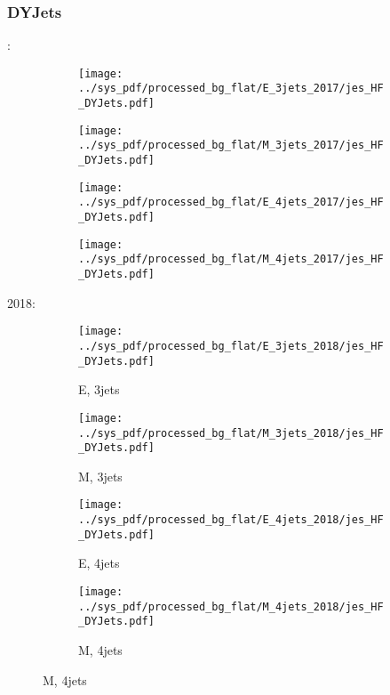 \documentclass{beamer}
\begin{document}
\begin{frame}
\frametitle{DYJets}
\fontsize{5}{1}:
\begin{figure}
\centering
\begin{subfigure}[b]{0.24\textwidth}
\texttt{[image: ../sys\_pdf/processed\_bg\_flat/E\_3jets\_2017/jes\_HF\_DYJets.pdf]}
\end{subfigure}
\begin{subfigure}[b]{0.24\textwidth}
\texttt{[image: ../sys\_pdf/processed\_bg\_flat/M\_3jets\_2017/jes\_HF\_DYJets.pdf]}
\end{subfigure}
\begin{subfigure}[b]{0.24\textwidth}
\texttt{[image: ../sys\_pdf/processed\_bg\_flat/E\_4jets\_2017/jes\_HF\_DYJets.pdf]}
\end{subfigure}
\begin{subfigure}[b]{0.24\textwidth}
\texttt{[image: ../sys\_pdf/processed\_bg\_flat/M\_4jets\_2017/jes\_HF\_DYJets.pdf]}
\end{subfigure}
\end{figure}
2018:
\begin{figure}
\centering
\begin{subfigure}[b]{0.24\textwidth}
\texttt{[image: ../sys\_pdf/processed\_bg\_flat/E\_3jets\_2018/jes\_HF\_DYJets.pdf]}
\captionsetup{font=tiny}
\caption{E, 3jets}
\end{subfigure}
\begin{subfigure}[b]{0.24\textwidth}
\texttt{[image: ../sys\_pdf/processed\_bg\_flat/M\_3jets\_2018/jes\_HF\_DYJets.pdf]}
\captionsetup{font=tiny}
\caption{M, 3jets}
\end{subfigure}
\begin{subfigure}[b]{0.24\textwidth}
\texttt{[image: ../sys\_pdf/processed\_bg\_flat/E\_4jets\_2018/jes\_HF\_DYJets.pdf]}
\captionsetup{font=tiny}
\caption{E, 4jets}
\end{subfigure}
\begin{subfigure}[b]{0.24\textwidth}
\texttt{[image: ../sys\_pdf/processed\_bg\_flat/M\_4jets\_2018/jes\_HF\_DYJets.pdf]}
\captionsetup{font=tiny}
\caption{M, 4jets}
\end{subfigure}
\end{figure}
\end{frame}
\end{document}
